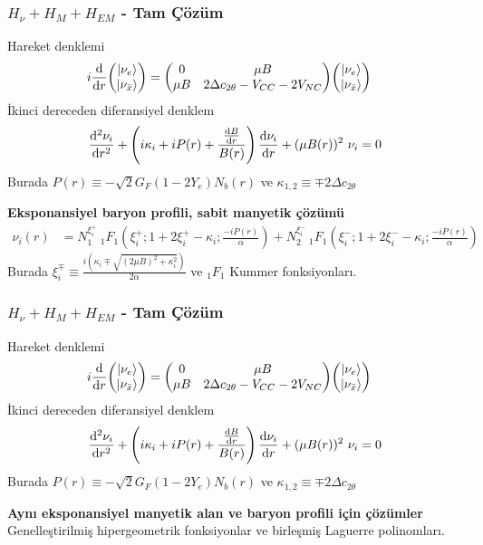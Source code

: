 \documentclass[10pt]{beamer}
\begin{document}
\begin{frame}
    \frametitle{$H_{\nu}+ H_{M}+ H_{EM}$ - Tam Çözüm}
    Hareket denklemi
    \scriptsize
    \begin{align*}
        i\dv{}{r} \mqty(\ket{\nu_{e}} \\ \ket{\nu_{\bar{x}}}) &= 
        \mqty(0 & \mu B \\ \mu B & 2\Delta c_{2\theta}-V_{CC}-2V_{NC}    ) 
        \mqty(\ket{\nu_{e}}\\ \ket{\nu_{\bar{x}}})
    \end{align*}
    \normalsize
    İkinci dereceden diferansiyel denklem
    \scriptsize
    \begin{equation*}
        \dv[2]{\nu_{i}}{r} + \left(i\kappa_{i}+iP(r) + \frac{\dv{B}{r}}{B(r)}\right) 
    \dv{\nu_{i}}{r}+ (\mu B(r))^{2}~ \nu_{i} = 0
    \end{equation*}
    \normalsize
    {\tiny Burada $ P(r) \equiv -\sqrt{2}G_{F}(1-2Y_{e})N_{b}(r) $ ve $ \kappa_{1,2} \equiv \mp 2\Delta c_{2\theta} $}
    
    \textbf{Eksponansiyel baryon profili, sabit manyetik çözümü}
    \scriptsize
    \begin{align*}
        \nu_{i}(r) & = N_{1}^{\xi^{+}_{i}}~ _{1}F_{1}\left(\xi^{+}_{i}; 
        1+2\xi^{+}_{i}-\kappa_{i};\frac{-iP(r)}{\alpha} \right) + N_{2}^{\xi^{-}_{i}} ~ _{1}F_{1}\left(\xi^{-}_{i}; 1+2\xi^{-}_{i}-
        \kappa_{i};\frac{-iP(r)}{\alpha}\right)
    \end{align*}
    {\tiny Burada $\xi^{\mp}_{i} \equiv \frac{i(\kappa_{i} \mp \sqrt{(2\mu B)^{2} + 
    \kappa^{2}_{i} } )}{2\alpha}$ ve $ _{1}F_{1} $ Kummer fonksiyonları.}
    \normalsize
\end{frame}

\begin{frame}
    \frametitle{$H_{\nu}+ H_{M}+ H_{EM}$ - Tam Çözüm}
    Hareket denklemi
    \scriptsize
    \begin{align*}
        i\dv{}{r} \mqty(\ket{\nu_{e}} \\ \ket{\nu_{\bar{x}}}) &= 
        \mqty(0 & \mu B \\ \mu B & 2\Delta c_{2\theta}-V_{CC}-2V_{NC}    ) 
        \mqty(\ket{\nu_{e}}\\ \ket{\nu_{\bar{x}}})
    \end{align*}
    \normalsize
    İkinci dereceden diferansiyel denklem
    \scriptsize
    \begin{equation*}
        \dv[2]{\nu_{i}}{r} + \left(i\kappa_{i}+iP(r) + \frac{\dv{B}{r}}{B(r)}\right) 
    \dv{\nu_{i}}{r}+ (\mu B(r))^{2}~ \nu_{i} = 0
    \end{equation*}
    \normalsize
    {\tiny Burada $ P(r) \equiv -\sqrt{2}G_{F}(1-2Y_{e})N_{b}(r) $ ve $ \kappa_{1,2} \equiv \mp 2\Delta c_{2\theta} $}
    
    \textbf{Aynı eksponansiyel manyetik alan ve baryon profili için çözümler}
    Genelleştirilmiş hipergeometrik fonksiyonlar ve birleşmiş Laguerre polinomları.
\end{frame}
\end{document}
